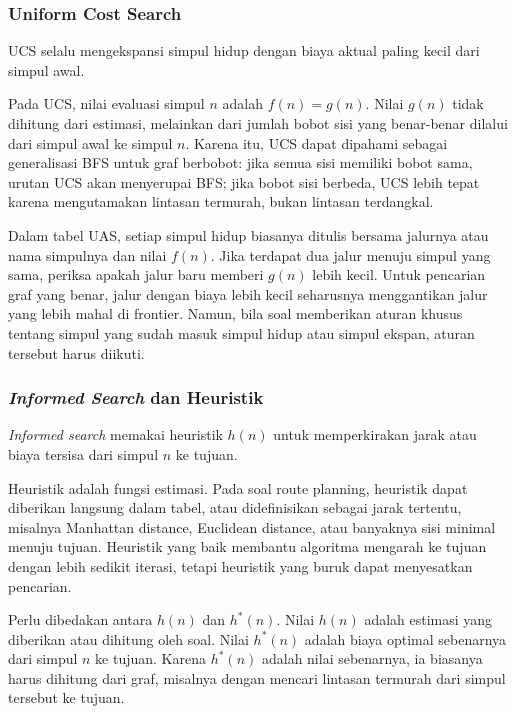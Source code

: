 \subsubsection{Uniform Cost Search}

\begin{jawab}
UCS selalu mengekspansi simpul hidup dengan biaya aktual paling kecil dari simpul awal.
\end{jawab}

Pada UCS, nilai evaluasi simpul $n$ adalah $f(n)=g(n)$. Nilai $g(n)$ tidak dihitung dari estimasi, melainkan dari jumlah bobot sisi yang benar-benar dilalui dari simpul awal ke simpul $n$. Karena itu, UCS dapat dipahami sebagai generalisasi BFS untuk graf berbobot: jika semua sisi memiliki bobot sama, urutan UCS akan menyerupai BFS; jika bobot sisi berbeda, UCS lebih tepat karena mengutamakan lintasan termurah, bukan lintasan terdangkal.

Dalam tabel UAS, setiap simpul hidup biasanya ditulis bersama jalurnya atau nama simpulnya dan nilai $f(n)$. Jika terdapat dua jalur menuju simpul yang sama, periksa apakah jalur baru memberi $g(n)$ lebih kecil. Untuk pencarian graf yang benar, jalur dengan biaya lebih kecil seharusnya menggantikan jalur yang lebih mahal di frontier. Namun, bila soal memberikan aturan khusus tentang simpul yang sudah masuk simpul hidup atau simpul ekspan, aturan tersebut harus diikuti.

\subsubsection{\textit{Informed Search} dan Heuristik}

\begin{jawab}
\textit{Informed search} memakai heuristik $h(n)$ untuk memperkirakan jarak atau biaya tersisa dari simpul $n$ ke tujuan.
\end{jawab}

Heuristik adalah fungsi estimasi. Pada soal route planning, heuristik dapat diberikan langsung dalam tabel, atau didefinisikan sebagai jarak tertentu, misalnya Manhattan distance, Euclidean distance, atau banyaknya sisi minimal menuju tujuan. Heuristik yang baik membantu algoritma mengarah ke tujuan dengan lebih sedikit iterasi, tetapi heuristik yang buruk dapat menyesatkan pencarian.

Perlu dibedakan antara $h(n)$ dan $h^*(n)$. Nilai $h(n)$ adalah estimasi yang diberikan atau dihitung oleh soal. Nilai $h^*(n)$ adalah biaya optimal sebenarnya dari simpul $n$ ke tujuan. Karena $h^*(n)$ adalah nilai sebenarnya, ia biasanya harus dihitung dari graf, misalnya dengan mencari lintasan termurah dari simpul tersebut ke tujuan.

